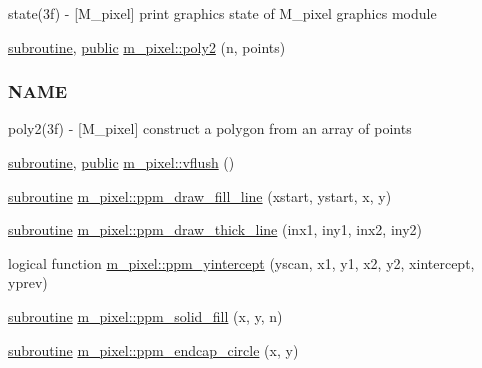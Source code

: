 \begin{DoxyCompactItemize}
\begin{DoxyCompactList}
state(3f) -\/ \mbox{[}M\+\_\+pixel\mbox{]} print graphics state of M\+\_\+pixel graphics module \end{DoxyCompactList}\item 
\hyperlink{M__stopwatch_83_8txt_acfbcff50169d691ff02d4a123ed70482}{subroutine}, \hyperlink{M__stopwatch_83_8txt_a2f74811300c361e53b430611a7d1769f}{public} \hyperlink{namespacem__pixel_a996117d631dce0e92056a0c486be5109}{m\+\_\+pixel\+::poly2} (n, points)
\begin{DoxyCompactList}\small\item\em \subsubsection*{N\+A\+ME}

poly2(3f) -\/ \mbox{[}M\+\_\+pixel\mbox{]} construct a polygon from an array of points \end{DoxyCompactList}\item 
\hyperlink{M__stopwatch_83_8txt_acfbcff50169d691ff02d4a123ed70482}{subroutine}, \hyperlink{M__stopwatch_83_8txt_a2f74811300c361e53b430611a7d1769f}{public} \hyperlink{namespacem__pixel_ae74cf11194379dbf13069a61b06589a2}{m\+\_\+pixel\+::vflush} ()
\item 
\hyperlink{M__stopwatch_83_8txt_acfbcff50169d691ff02d4a123ed70482}{subroutine} \hyperlink{namespacem__pixel_a6f75bc951acd07267e0841ca5985d8b7}{m\+\_\+pixel\+::ppm\+\_\+draw\+\_\+fill\+\_\+line} (xstart, ystart, x, y)
\item 
\hyperlink{M__stopwatch_83_8txt_acfbcff50169d691ff02d4a123ed70482}{subroutine} \hyperlink{namespacem__pixel_a1629b7134d0ea4b0f301ca23df764b8e}{m\+\_\+pixel\+::ppm\+\_\+draw\+\_\+thick\+\_\+line} (inx1, iny1, inx2, iny2)
\item 
logical function \hyperlink{namespacem__pixel_a4924b3a5033acb74a4f4df60a4ba21eb}{m\+\_\+pixel\+::ppm\+\_\+yintercept} (yscan, x1, y1, x2, y2, xintercept, yprev)
\item 
\hyperlink{M__stopwatch_83_8txt_acfbcff50169d691ff02d4a123ed70482}{subroutine} \hyperlink{namespacem__pixel_aedaf33a27e9899da22c2497aff2af903}{m\+\_\+pixel\+::ppm\+\_\+solid\+\_\+fill} (x, y, n)
\item 
\hyperlink{M__stopwatch_83_8txt_acfbcff50169d691ff02d4a123ed70482}{subroutine} \hyperlink{namespacem__pixel_aede24c612504a3e416840e6242c2d8fb}{m\+\_\+pixel\+::ppm\+\_\+endcap\+\_\+circle} (x, y)
\end{DoxyCompactItemize}
